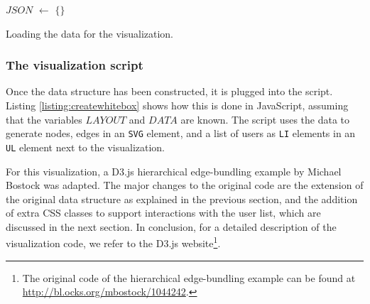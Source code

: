 \begin{algorithm}[H]
	{
		\SetAlgoLined
		$JSON$ $\leftarrow$ $\{\}$ \;
		}
	\caption{Loading the data for the visualization.}
	\label{alg:createjson}
\end{algorithm}


\subsubsection{The visualization script}

Once the data structure has been constructed, it is plugged into the script. Listing \ref{listing:createwhitebox} shows how this is done in JavaScript, assuming that the variables $LAYOUT$ and $DATA$ are known. The script uses the data to generate nodes, edges in an \texttt{SVG} element, and a list of users as \texttt{LI} elements in an \texttt{UL} element next to the visualization.

For this visualization, a D3.js hierarchical edge-bundling example by Michael Bostock was adapted. The major changes to the original code are the extension of the original data structure as explained in the previous section, and the addition of extra CSS classes to support interactions with the user list, which are discussed in the next section. In conclusion, for a detailed description of the visualization code, we refer to the D3.js website\footnote{The original code of the hierarchical edge-bundling example can be found at \url{http://bl.ocks.org/mbostock/1044242}.}.


